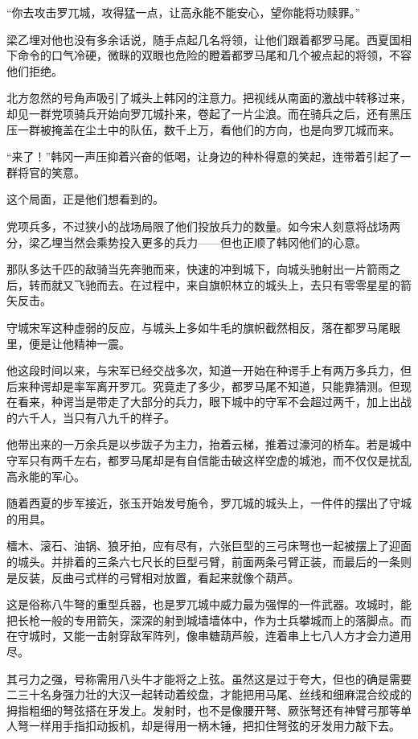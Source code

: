“你去攻击罗兀城，攻得猛一点，让高永能不能安心，望你能将功赎罪。”

梁乙埋对他也没有多余话说，随手点起几名将领，让他们跟着都罗马尾。西夏国相下命令的口气冷硬，微眯的双眼也危险的瞪着都罗马尾和几个被点起的将领，不容他们拒绝。

北方忽然的号角声吸引了城头上韩冈的注意力。把视线从南面的激战中转移过来，却见一群党项骑兵开始向罗兀城扑来，卷起了一片尘浪。而在骑兵之后，还有黑压压一群被掩盖在尘土中的队伍，数千上万，看他们的方向，也是向罗兀城而来。

“来了！”韩冈一声压抑着兴奋的低喝，让身边的种朴得意的笑起，连带着引起了一群将官的笑意。

这个局面，正是他们想看到的。

党项兵多，不过狭小的战场局限了他们投放兵力的数量。如今宋人刻意将战场两分，梁乙埋当然会乘势投入更多的兵力——但也正顺了韩冈他们的心意。

那队多达千匹的敌骑当先奔驰而来，快速的冲到城下，向城头驰射出一片箭雨之后，转而就又飞驰而去。在过程中，来自旗帜林立的城头上，去只有零零星星的箭矢反击。

守城宋军这种虚弱的反应，与城头上多如牛毛的旗帜截然相反，落在都罗马尾眼里，便是让他精神一震。

他这段时间以来，与宋军已经交战多次，知道一开始在种谔手上有两万多兵力，但后来种谔却是率军离开罗兀。究竟走了多少，都罗马尾不知道，只能靠猜测。但现在看来，种谔当是带走了大部分的兵力，眼下城中的守军不会超过两千，加上出战的六千人，当只有八九千的样子。

他带出来的一万余兵是以步跋子为主力，抬着云梯，推着过濠河的桥车。若是城中守军只有两千左右，都罗马尾却是有自信能击破这样空虚的城池，而不仅仅是扰乱高永能的军心。

随着西夏的步军接近，张玉开始发号施令，罗兀城的城头上，一件件的摆出了守城的用具。

檑木、滚石、油锅、狼牙拍，应有尽有，六张巨型的三弓床弩也一起被摆上了迎面的城头。并排着的三条六七尺长的巨型弓臂，前面两条弓臂正装，而最后的一条则是反装，反曲弓式样的弓臂相对放置，看起来就像个葫芦。

这是俗称八牛弩的重型兵器，也是罗兀城中威力最为强悍的一件武器。攻城时，能把长枪一般的专用箭矢，深深的射到城墙墙体中，作为士兵攀城而上的落脚点。而在守城时，又能一击射穿敌军阵列，像串糖葫芦般，连着串上七八人方才会力道用尽。

其弓力之强，号称需用八头牛才能将之上弦。虽然这是过于夸大，但也的确是需要二三十名身强力壮的大汉一起转动着绞盘，才能把用马尾、丝线和细麻混合绞成的拇指粗细的弩弦搭在牙发上。发射时，也不是像腰开弩、厥张弩还有神臂弓那等单人弩一样用手指扣动扳机，却是得用一柄木锤，把扣住弩弦的牙发用力敲下去。

